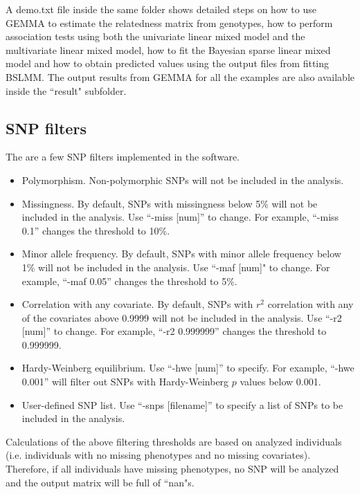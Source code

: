 \documentclass[11pt]{article}
\begin{document}
A demo.txt file inside the same folder shows detailed steps on how to use GEMMA to estimate the relatedness matrix from genotypes, how to perform association tests using both the univariate linear mixed model and the multivariate linear mixed model, how to fit the Bayesian sparse linear mixed model and how to obtain predicted values using the output files from fitting BSLMM. The output results from GEMMA for all the examples are also available inside the ``result" subfolder. 



\subsection{SNP filters}
The are a few SNP filters implemented in the software.
\begin{itemize}
\item Polymorphism. Non-polymorphic SNPs will not be included in the analysis.
\item Missingness. By default, SNPs with missingness below 5\% will not be included in the analysis. Use ``-miss [num]'' to change. For example, ``-miss 0.1'' changes the threshold to 10\%.
\item Minor allele frequency. By default, SNPs with minor allele frequency below 1\% will not be included in the analysis. Use ``-maf [num]" to change. For example, ``-maf 0.05'' changes the threshold to 5\%.
\item Correlation with any covariate. By default, SNPs with $r^2$ correlation with any of the covariates above 0.9999 will not be included in the analysis. Use ``-r2 [num]'' to change. For example, ``-r2 0.999999'' changes the threshold to 0.999999.
\item Hardy-Weinberg equilibrium. Use ``-hwe [num]'' to specify. For example, ``-hwe 0.001'' will filter out SNPs with Hardy-Weinberg $p$ values below 0.001.
\item User-defined SNP list. Use ``-snps [filename]'' to specify a list of SNPs to be included in the analysis. 
\end{itemize}

Calculations of the above filtering thresholds are based on analyzed individuals (i.e. individuals with no missing phenotypes and no missing covariates). Therefore, if all individuals have missing phenotypes, no SNP will be analyzed and the output matrix will be full of ``nan"s. 
\end{document}
